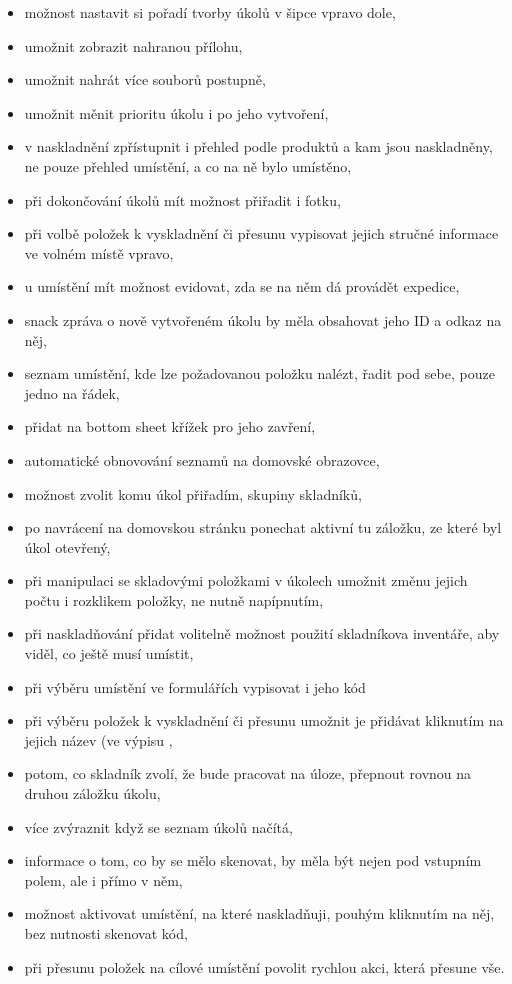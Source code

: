 \begin{itemize}
	\item možnost nastavit si pořadí tvorby úkolů v šipce vpravo dole,
	\item umožnit zobrazit nahranou přílohu,
	\item umožnit nahrát více souborů postupně,
	\item umožnit měnit prioritu úkolu i po jeho vytvoření,
	\item v naskladnění zpřístupnit i přehled podle produktů a kam jsou naskladněny, ne pouze přehled umístění, a co na ně bylo umístěno,
	\item při dokončování úkolů mít možnost přiřadit i fotku,
	\item při volbě položek k vyskladnění či přesunu vypisovat jejich stručné informace ve volném místě vpravo,
	\item u umístění mít možnost evidovat, zda se na něm dá provádět expedice,
	\item snack zpráva o nově vytvořeném úkolu by měla obsahovat jeho ID a odkaz na něj,
	\item seznam umístění, kde lze požadovanou položku nalézt, řadit pod sebe, pouze jedno na řádek,
	\item přidat na bottom sheet křížek pro jeho zavření,
	\item automatické obnovování seznamů na domovské obrazovce,
	\item možnost zvolit komu úkol přiřadím, skupiny skladníků,
	\item po navrácení na domovskou stránku ponechat aktivní tu záložku, ze které byl úkol otevřený,
	\item při manipulaci se skladovými položkami v úkolech umožnit změnu jejich počtu i rozklikem položky, ne nutně napípnutím,
	\item při naskladňování přidat volitelně možnost použití skladníkova inventáře, aby viděl, co ještě musí umístit,
	\item při výběru umístění ve formulářích vypisovat i jeho kód
	\item při výběru položek k vyskladnění či přesunu umožnit je přidávat kliknutím na jejich název (ve výpisu ,
	\item potom, co skladník zvolí, že bude pracovat na úloze, přepnout rovnou na druhou záložku úkolu,
	\item více zvýraznit když se seznam úkolů načítá,
	\item informace o tom, co by se mělo skenovat, by měla být nejen pod vstupním polem, ale i přímo v něm,
	\item možnost aktivovat umístění, na které naskladňuji, pouhým kliknutím na něj, bez nutnosti skenovat kód,
	\item při přesunu položek na cílové umístění povolit rychlou akci, která přesune vše.
\end{itemize}

